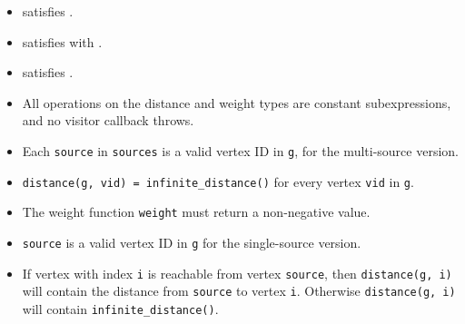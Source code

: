 \begin{itemdescr}
      \pnum\mandates
            \begin{itemize}
                  \item {} satisfies .
                  \item {} satisfies 
                        with .
                  \item {} satisfies .
            \end{itemize}
      \pnum\constantwhen
            \begin{itemize}
                  \item All operations on the distance and weight types
                        are constant subexpressions, and no visitor callback throws.
            \end{itemize}
      \pnum\preconditions
            \begin{itemize}
                  \item
                        Each \lstinline{source} in \lstinline{sources} is a valid vertex ID in \lstinline{g},
                        for the multi-source version.
                  \item
                        \lstinline{distance(g, vid) = infinite_distance()} for every vertex \lstinline{vid} in \lstinline{g}.
                  \item
                        The weight function \lstinline{weight} must return a non-negative value.
            \end{itemize}
      \pnum\hardprecond
            \begin{itemize}
                  \item \lstinline{source} is a valid vertex ID in \lstinline{g} for the single-source version.
            \end{itemize}
      \pnum\effects
            \begin{itemize}
                  \item
                        If vertex with index \lstinline{i} is reachable from vertex \lstinline{source}, then
                        \lstinline{distance(g, i)} will contain the distance from \lstinline{source} to vertex
                        \lstinline{i}.  Otherwise \lstinline{distance(g, i)} will contain
                        \lstinline{infinite_distance()}.

\end{itemize}
\end{itemdescr}
